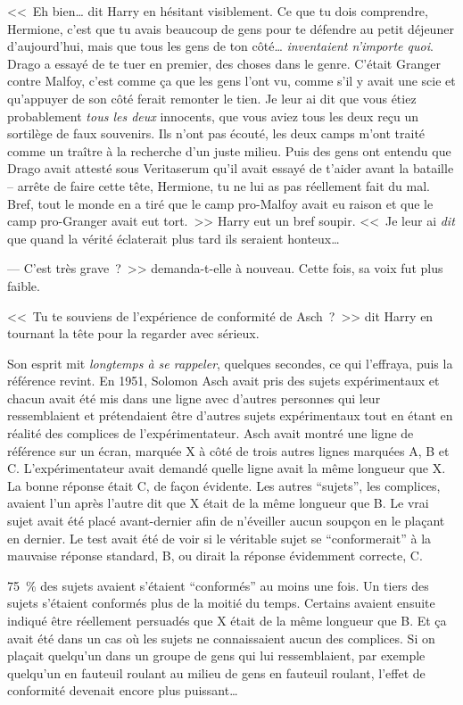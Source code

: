 <<~Eh bien… dit Harry en hésitant visiblement. Ce que tu dois comprendre, Hermione, c'est que tu avais beaucoup de gens pour te défendre au petit déjeuner d'aujourd'hui, mais que tous les gens de ton côté… \emph{inventaient n'importe quoi}. Drago a essayé de te tuer en premier, des choses dans le genre. C'était Granger contre Malfoy, c'est comme ça que les gens l'ont vu, comme s'il y avait une scie et qu'appuyer de son côté ferait remonter le tien. Je leur ai dit que vous étiez probablement \emph{tous les deux} innocents, que vous aviez tous les deux reçu un sortilège de faux souvenirs. Ils n'ont pas écouté, les deux camps m'ont traité comme un traître à la recherche d'un juste milieu. Puis des gens ont entendu que Drago avait attesté sous Veritaserum qu'il avait essayé de t'aider avant la bataille -- arrête de faire cette tête, Hermione, tu ne lui as pas réellement fait du mal. Bref, tout le monde en a tiré que le camp pro-Malfoy avait eu raison et que le camp pro-Granger avait eut tort.~>> Harry eut un bref soupir. <<~Je leur ai \emph{dit} que quand la vérité éclaterait plus tard ils seraient honteux…

--- C'est très grave~?~>> demanda-t-elle à nouveau. Cette fois, sa voix fut plus faible.

<<~Tu te souviens de l'expérience de conformité de Asch~?~>> dit Harry en tournant la tête pour la regarder avec sérieux.

Son esprit mit \emph{longtemps à se rappeler}, quelques secondes, ce qui l'effraya, puis la référence revint. En 1951, Solomon Asch avait pris des sujets expérimentaux et chacun avait été mis dans une ligne avec d'autres personnes qui leur ressemblaient et prétendaient être d'autres sujets expérimentaux tout en étant en réalité des complices de l'expérimentateur. Asch avait montré une ligne de référence sur un écran, marquée X à côté de trois autres lignes marquées A, B et C. L'expérimentateur avait demandé quelle ligne avait la même longueur que X. La bonne réponse était C, de façon évidente. Les autres “sujets”, les complices, avaient l'un après l'autre dit que X était de la même longueur que B. Le vrai sujet avait été placé avant-dernier afin de n'éveiller aucun soupçon en le plaçant en dernier. Le test avait été de voir si le véritable sujet se “conformerait” à la mauvaise réponse standard, B, ou dirait la réponse évidemment correcte, C.

75~\% des sujets avaient s'étaient “conformés” au moins une fois. Un tiers des sujets s'étaient conformés plus de la moitié du temps. Certains avaient ensuite indiqué être réellement persuadés que X était de la même longueur que B. Et ça avait été dans un cas où les sujets ne connaissaient aucun des complices. Si on plaçait quelqu'un dans un groupe de gens qui lui ressemblaient, par exemple quelqu'un en fauteuil roulant au milieu de gens en fauteuil roulant, l'effet de conformité devenait encore plus puissant…

